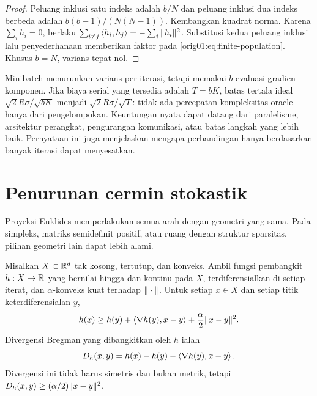 \begin{proof}
  Peluang inklusi satu indeks adalah $b/N$ dan peluang inklusi dua indeks
  berbeda adalah $b(b-1)/(N(N-1))$. Kembangkan kuadrat norma. Karena
  $\sum_i h_i=0$, berlaku
  $\sum_{i\ne j}\left\langle h_i , h_j\right\rangle=-\sum_i\|h_i\|^2$. Substitusi kedua
  peluang inklusi lalu penyederhanaan memberikan faktor pada
  \eqref{orig01:eq:finite-population}. Khusus $b=N$, varians tepat nol.
\end{proof}

Minibatch menurunkan varians per iterasi, tetapi memakai $b$ evaluasi gradien
komponen. Jika biaya serial yang tersedia adalah $T=bK$, batas tertala ideal
$\sqrt2R\sigma/\sqrt{bK}$ menjadi $\sqrt2R\sigma/\sqrt T$: tidak ada
percepatan kompleksitas oracle hanya dari pengelompokan. Keuntungan nyata
dapat datang dari paralelisme, arsitektur perangkat, pengurangan komunikasi,
atau batas langkah yang lebih baik. Pernyataan ini juga menjelaskan mengapa
perbandingan hanya berdasarkan banyak iterasi dapat menyesatkan.

\section{Penurunan cermin stokastik}
\label{orig01:section:mirror}

Proyeksi Euklides memperlakukan semua arah dengan geometri yang sama. Pada
simpleks, matriks semidefinit positif, atau ruang dengan struktur sparsitas,
pilihan geometri lain dapat lebih alami.

Misalkan $X\subset\mathbb{R}^d$ tak kosong, tertutup, dan konveks. Ambil fungsi
pembangkit $h:X\to\mathbb{R}$ yang bernilai hingga dan kontinu pada $X$,
terdiferensialkan di setiap iterat, dan $\alpha$-konveks kuat terhadap
$\|\cdot\|$. Untuk setiap $x\in X$ dan setiap titik keterdiferensialan $y$,
\begin{equation}
    h(x)\geq h(y)+\left\langle\nabla h(y) , x-y\right\rangle
  +\frac\alpha2\|x-y\|^2.
\end{equation}
Divergensi Bregman yang dibangkitkan oleh $h$ ialah
\begin{equation}
  \label{orig01:eq:bregman}
  D_h(x,y)=h(x)-h(y)-\left\langle\nabla h(y) , x-y\right\rangle.
\end{equation}
Divergensi ini tidak harus simetris dan bukan metrik, tetapi
$D_h(x,y)\geq(\alpha/2)\|x-y\|^2$.

